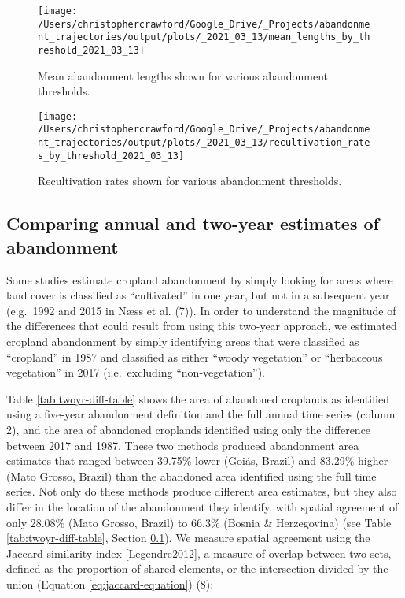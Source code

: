 \documentclass[9pt,twoside,lineno]{pnas-new}
\begin{document}
\begin{figure}
\texttt{[image: /Users/christophercrawford/Google\_Drive/\_Projects/abandonment\_trajectories/output/plots/\_2021\_03\_13/mean\_lengths\_by\_threshold\_2021\_03\_13]} \caption{Mean abandonment lengths shown for various abandonment thresholds.}\label{fig:abn-thresholds-mean-duration}
\end{figure}



\begin{figure}
\texttt{[image: /Users/christophercrawford/Google\_Drive/\_Projects/abandonment\_trajectories/output/plots/\_2021\_03\_13/recultivation\_rates\_by\_threshold\_2021\_03\_13]} \caption{Recultivation rates shown for various abandonment thresholds.}\label{fig:recult-by-threshold}
\end{figure}

\hypertarget{twoyr-vs-annual}{%
\subsection{Comparing annual and two-year estimates of abandonment}\label{twoyr-vs-annual}}

Some studies estimate cropland abandonment by simply looking for areas where land cover is classified as ``cultivated'' in one year, but not in a subsequent year (e.g.~1992 and 2015 in Næss et al. (7)).
In order to understand the magnitude of the differences that could result from using this two-year approach, we estimated cropland abandonment by simply identifying areas that were classified as ``cropland'' in 1987 and classified as either ``woody vegetation'' or ``herbaceous vegetation'' in 2017 (i.e.~excluding ``non-vegetation'').

Table \ref{tab:twoyr-diff-table} shows the area of abandoned croplands as identified using a five-year abandonment definition and the full annual time series (column 2), and the area of abandoned croplands identified using only the difference between 2017 and 1987.
These two methods produced abandonment area estimates that ranged between 39.75\% lower (Goiás, Brazil) and 83.29\% higher (Mato Grosso, Brazil) than the abandoned area identified using the full time series.
Not only do these methods produce different area estimates, but they also differ in the location of the abandonment they identify, with spatial agreement of only 28.08\% (Mato Grosso, Brazil) to 66.3\% (Bosnia \& Herzegovina) (see Table \ref{tab:twoyr-diff-table}, Section \ref{twoyr-vs-annual}).
We measure spatial agreement using the Jaccard similarity index {[}Legendre2012{]}, a measure of overlap between two sets, defined as the proportion of shared elements, or the intersection divided by the union (Equation \eqref{eq:jaccard-equation}) (8):
\end{document}

